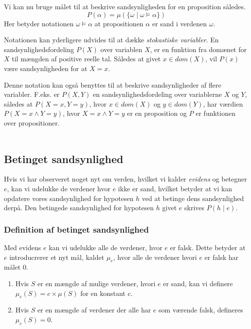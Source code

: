 Vi kan nu bruge målet til at beskrive sandsynligheden for en proposition således.
$$P(\alpha) = \mu(\{\omega \mid \omega \models \alpha \})$$
Her betyder notationen $\omega \models \alpha$ at propositionen $\alpha$ er sand i verdenen $\omega$.


Notationen kan yderligere udvides til at dække \emph{stokastiske variabler}.
En sandsynlighedsfordeling $P(X)$ over variablen $ X $, er en funktion fra
domænet for $ X $ til mængden af positive reelle tal.
Således at givet $x \in dom(X)$, vil $P(x)$ være sandsynligheden for at $X = x$.

Denne notation kan også benyttes til at beskrive sandsynligheder af flere variabler.
F.eks. er $P(X,Y)$ en sandsynlighedsfordeling over variablerne $ X $ og $ Y $, 
således at $P(X = x, Y = y)$, hvor $x \in dom(X)$ og $y \in dom(Y)$, 
har værdien $P(X = x \wedge Y = y)$, hvor
$X = x \wedge Y = y$ er en proposition og $ P $ er funktionen over propositioner. \\ \\
\cite[s. 221-222]{ArtificialIntelligence}

\subsection{Betinget sandsynlighed}

Hvis vi har observeret noget nyt om verden, hvilket vi kalder \emph{evidens} og betegner $ e $, kan vi udelukke de verdener
hvor $ e $ ikke er sand, hvilket betyder at vi kan opdatere vores sandsynlighed for hypotesen $ h $ ved at betinge dens sandsynlighed derpå.
Den betingede sandsynlighed for hypotesen $ h $ givet $ e $ skrives $P(h \mid e)$.


\subsubsection{Definition af betinget sandsynlighed}
Med evidens $e$ kan vi udelukke alle de verdener, hvor $e$ er falsk.
Dette betyder at $e$ introducrerer et nyt mål, kaldet $\mu_e$, hvor
alle de verdener hvori $e$ er falsk har målet $0$.
\begin{enumerate}
    \item Hvis $S$ er en mængde af mulige verdener, hvori $e$ er sand, 
kan vi definere $\mu_e(S) = c \times \mu(S)$ for en konstant c. 
    \item Hvis $S$ er en mængde af verdener der alle har $e$ som værende falsk, defineres $\mu_e(S) = 0$.
\end{enumerate}

